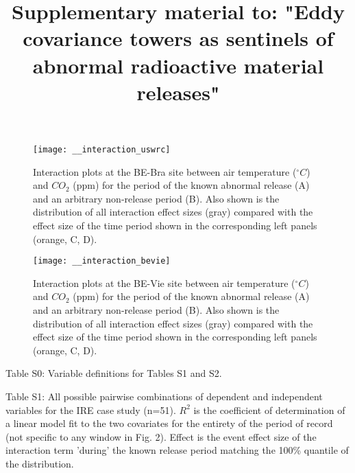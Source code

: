 \documentclass{article}
\begin{document}
\title{Supplementary material to: "Eddy covariance towers as sentinels of abnormal radioactive material releases"}
\date{}
\maketitle


\makeatletter 
\renewcommand{\thefigure}{S\@arabic\c@figure}
\makeatother

\begin{figure}[H]
	\centering
	\texttt{[image: \_\_interaction\_uswrc]}
	\caption{Interaction plots at the BE-Bra site between air temperature ($^{\circ}C$) and $CO_2$ (ppm) for the period of the known abnormal release (A) and an arbitrary non-release period (B). Also shown is the distribution of all interaction effect sizes (gray) compared with the effect size of the time period shown in the corresponding left panels (orange, C, D).}
	\label{fig:interaction_bebra}
\end{figure}

\begin{figure}[H]
	\centering
	\texttt{[image: \_\_interaction\_bevie]}
	\caption{Interaction plots at the BE-Vie site between air temperature ($^{\circ}C$) and $CO_2$ (ppm) for the period of the known abnormal release (A) and an arbitrary non-release period (B). Also shown is the distribution of all interaction effect sizes (gray) compared with the effect size of the time period shown in the corresponding left panels (orange, C, D).}
	\label{fig:interaction_bevie}
\end{figure}


\newpage

\noindent Table S0: Variable definitions for Tables S1 and S2.


\noindent Table S1: All possible pairwise combinations of dependent and independent variables for the IRE case study (n=51). $R^2$ is the coefficient of determination of a linear model fit to the two covariates for the entirety of the period of record (not specific to any window in Fig. 2). Effect is the event effect size of the interaction term 'during' the known release period matching the 100\% quantile of the distribution.
\end{document}
